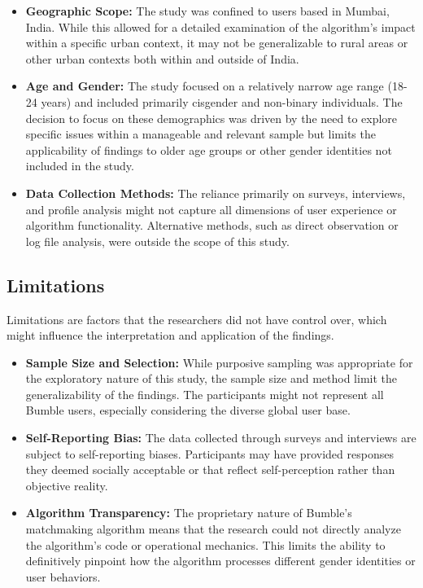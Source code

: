 \begin{itemize}
    \item \textbf{Geographic Scope:} The study was confined to users based in Mumbai, India. While this allowed for a detailed examination of the algorithm’s impact within a specific urban context, it may not be generalizable to rural areas or other urban contexts both within and outside of India.
    \item \textbf{Age and Gender:} The study focused on a relatively narrow age range (18-24 years) and included primarily cisgender and non-binary individuals. The decision to focus on these demographics was driven by the need to explore specific issues within a manageable and relevant sample but limits the applicability of findings to older age groups or other gender identities not included in the study.
    \item \textbf{Data Collection Methods:} The reliance primarily on surveys, interviews, and profile analysis might not capture all dimensions of user experience or algorithm functionality. Alternative methods, such as direct observation or log file analysis, were outside the scope of this study.
\end{itemize}

\subsection{Limitations}
Limitations are factors that the researchers did not have control over, which might influence the interpretation and application of the findings.

\begin{itemize}
    \item \textbf{Sample Size and Selection:} While purposive sampling was appropriate for the exploratory nature of this study, the sample size and method limit the generalizability of the findings. The participants might not represent all Bumble users, especially considering the diverse global user base.
    \item \textbf{Self-Reporting Bias:} The data collected through surveys and interviews are subject to self-reporting biases. Participants may have provided responses they deemed socially acceptable or that reflect self-perception rather than objective reality.
    \item \textbf{Algorithm Transparency:} The proprietary nature of Bumble’s matchmaking algorithm means that the research could not directly analyze the algorithm’s code or operational mechanics. This limits the ability to definitively pinpoint how the algorithm processes different gender identities or user behaviors. 
\end{itemize}


